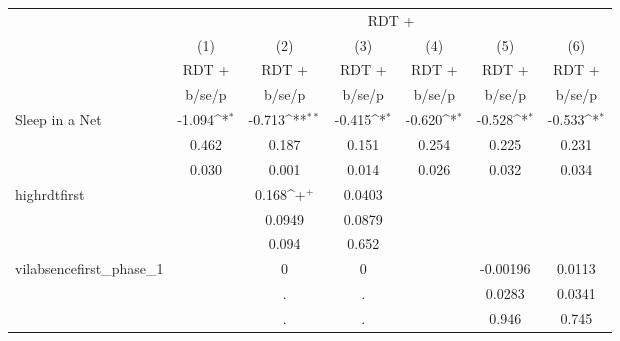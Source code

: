 {
\def\sym#1{\ifmmode^{#1}\else\(^{#1}\)\fi}
\begin{tabular}{l*{6}{c}}
\hline\hline
                    &\multicolumn{6}{c}{RDT +}                                                                                                          \\
                    &\multicolumn{1}{c}{(1)}&\multicolumn{1}{c}{(2)}&\multicolumn{1}{c}{(3)}&\multicolumn{1}{c}{(4)}&\multicolumn{1}{c}{(5)}&\multicolumn{1}{c}{(6)}\\
                    &\multicolumn{1}{c}{RDT +}&\multicolumn{1}{c}{RDT +}&\multicolumn{1}{c}{RDT +}&\multicolumn{1}{c}{RDT +}&\multicolumn{1}{c}{RDT +}&\multicolumn{1}{c}{RDT +}\\
                    &      b/se/p         &      b/se/p         &      b/se/p         &      b/se/p         &      b/se/p         &      b/se/p         \\
\hline
Sleep in a Net      &      -1.094\sym{*}  &      -0.713\sym{**} &      -0.415\sym{*}  &      -0.620\sym{*}  &      -0.528\sym{*}  &      -0.533\sym{*}  \\
                    &       0.462         &       0.187         &       0.151         &       0.254         &       0.225         &       0.231         \\
                    &       0.030         &       0.001         &       0.014         &       0.026         &       0.032         &       0.034         \\
highrdtfirst        &                     &       0.168\sym{+}  &      0.0403         &                     &                     &                     \\
                    &                     &      0.0949         &      0.0879         &                     &                     &                     \\
                    &                     &       0.094         &       0.652         &                     &                     &                     \\
vilabsencefirst\_phase\_1&                     &           0         &           0         &                     &    -0.00196         &      0.0113         \\
                    &                     &           .         &           .         &                     &      0.0283         &      0.0341         \\
                    &                     &           .         &           .         &                     &       0.946         &       0.745         \\

\end{tabular}}
